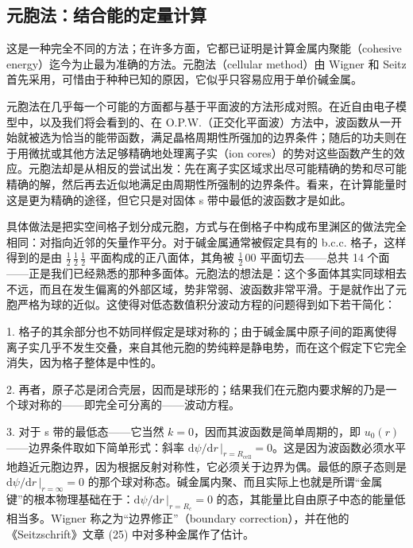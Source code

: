 
\subsection{元胞法：结合能的定量计算}

这是一种完全不同的方法；在许多方面，它都已证明是计算金属内聚能（cohesive energy）迄今为止最为准确的方法。元胞法（cellular method）由 Wigner 和 Seitz 首先采用，可惜由于种种已知的原因，它似乎只容易应用于单价碱金属。

元胞法在几乎每一个可能的方面都与基于平面波的方法形成对照。在近自由电子模型中，以及我们将会看到的、在 O.P.W.（正交化平面波）方法中，波函数从一开始就被选为恰当的能带函数，满足晶格周期性所强加的边界条件；随后的功夫则在于用微扰或其他方法足够精确地处理离子实（ion cores）的势对这些函数产生的效应。元胞法却是从相反的尝试出发：先在离子实区域求出尽可能精确的势和尽可能精确的解，然后再去近似地满足由周期性所强制的边界条件。看来，在计算能量时这是更为精确的途径，但它只是对固体 s 带中最低的波函数才是如此。

具体做法是把实空间格子划分成元胞，方式与在倒格子中构成布里渊区的做法完全相同：对指向近邻的矢量作平分。对于碱金属通常被假定具有的 b.c.c. 格子，这样得到的是由 $\tfrac{1}{2}\,\tfrac{1}{2}\,\tfrac{1}{2}$ 平面构成的正八面体，其角被 $\tfrac{1}{2}\,00$ 平面切去——总共 14 个面——正是我们已经熟悉的那种多面体。元胞法的想法是：这个多面体其实同球相去不远，而且在发生偏离的外部区域，势非常弱、波函数非常平滑。于是就作出了元胞严格为球的近似。这使得对低态数值积分波动方程的问题得到如下若干简化：

1. 格子的其余部分也不妨同样假定是球对称的；由于碱金属中原子间的距离使得离子实几乎不发生交叠，来自其他元胞的势纯粹是静电势，而在这个假定下它完全消失，因为格子整体是中性的。

2. 再者，原子芯是闭合壳层，因而是球形的；结果我们在元胞内要求解的乃是一个球对称的——即完全可分离的——波动方程。

3. 对于 s 带的最低态——它当然 $k=0$，因而其波函数是简单周期的，即 $u_0(r)$——边界条件取如下简单形式：斜率 $\mathrm{d}\psi/\mathrm{d}r\,\big|_{r=R_{\mathrm{cell}}}=0$。这是因为波函数必须水平地趋近元胞边界，因为根据反射对称性，它必须关于边界为偶。最低的原子态则是 $\mathrm{d}\psi/\mathrm{d}r\,\big|_{r=\infty}=0$ 的那个球对称态。碱金属内聚、而且实际上也就是所谓“金属键”的根本物理基础在于：$\mathrm{d}\psi/\mathrm{d}r\,\big|_{r=R_c}=0$ 的态，其能量比自由原子中态的能量低相当多。Wigner 称之为“边界修正”（boundary correction），并在他的《Seitzschrift》文章 (25) 中对多种金属作了估计。

